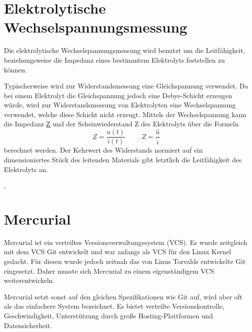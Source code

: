 			\cite{I2C}
	\section{Elektrolytische Wechselspannungsmessung}
		Die elektrolytische Wechselspannungsmessung wird benutzt um die Leitfähigkeit, beziehungsweise die Impedanz eines bestimmtem Elektrolyts feststellen zu können.
		
		Typischerweise wird zur Widerstandsmessung eine Gleichspannung verwendet. Da bei einem Elektrolyt die Gleichspannung jedoch eine Debye-Schicht erzeugen würde, wird zur Widerstandsmessung von Elektrolyten eine Wechselspannung verwendet, welche diese Schicht nicht erzeugt. Mittels der Wechselspannung kann die Impedanz \underline{Z} und der Scheinwiederstand Z des Elektrolyts über die Formeln
		\[ \underline{Z} = \frac{u(t)}{i(t)}\hspace{1cm}Z = \frac{\hat{u}}{\hat{i}} \]
		berechnet werden. Der Kehrwert des Widerstands normiert auf ein dimensioniertes Stück des leitenden Materials gibt letztlich die Leitfähigkeit des Elektrolyts an.
		
		\cite{Impedanz}, \cite{Leitwert}
	\section{Mercurial}
		Mercurial ist ein verteiltes Versionsverwaltungssystem (VCS). Es wurde zeitgleich mit dem VCS Git entwickelt und war anfangs als VCS für den Linux Kernel gedacht. Für diesen wurde jedoch zeitnah das von Linus Torvalds entwickelte Git eingesetzt. Daher musste sich Mercurial zu einem eigenständigem VCS weiterentwickeln.
		
		Mercurial setzt sonst auf den gleichen Spezifikationen wie Git auf, wird aber oft als das einfachere System bezeichnet. Es bietet verteilte Versionskontrolle, Geschwindigkeit, Unterstützung durch große Hosting-Plattformen und Datensicherheit.
		
		\cite{Mercurial}